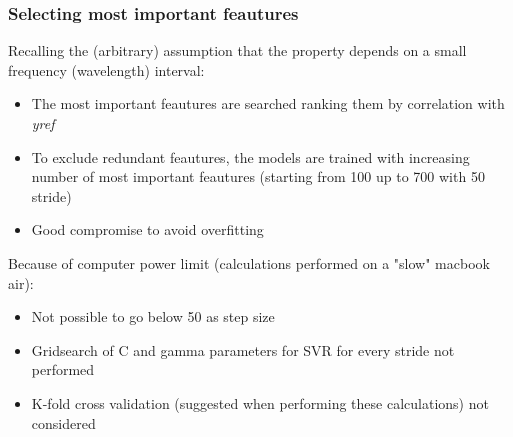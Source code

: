 \begin{frame}
    \frametitle{Selecting most important feautures}
    Recalling the (arbitrary) assumption that the property depends on a small frequency (wavelength) interval: 
    \begin{itemize}
        \item The most important feautures are searched ranking them by correlation with \textit{yref}
        \item To exclude redundant feautures, the models are trained with increasing number of most important feautures (starting from 100 up to 700 with 50 stride)
        \item Good compromise to avoid overfitting
    \end{itemize}
    Because of computer power limit (calculations performed on a "slow" macbook air):
    \begin{itemize}
        \item Not possible to go below 50 as step size
        \item Gridsearch of C and gamma parameters for SVR for every stride not performed
        \item K-fold cross validation (suggested when performing these calculations) not considered
    \end{itemize}
\end{frame}